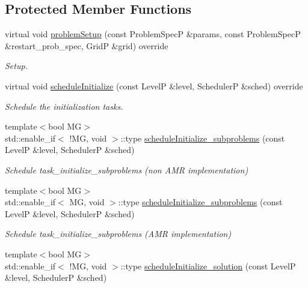 \subsection*{Protected Member Functions}
\begin{DoxyCompactItemize}
\item 
virtual void \hyperlink{classUintah_1_1PhaseField_1_1PureMetal_a2a7b57e07c20ed1a745904886da00323}{problem\+Setup} (const Problem\+SpecP \&params, const Problem\+SpecP \&restart\+\_\+prob\+\_\+spec, GridP \&grid) override
\begin{DoxyCompactList}\small\item\em Setup. \end{DoxyCompactList}\item 
virtual void \hyperlink{classUintah_1_1PhaseField_1_1PureMetal_a40c84aed55de21d116c941ae78cdfbaa}{schedule\+Initialize} (const LevelP \&level, SchedulerP \&sched) override
\begin{DoxyCompactList}\small\item\em Schedule the initialization tasks. \end{DoxyCompactList}\item 
{\footnotesize template$<$bool MG$>$ }\\std\+::enable\+\_\+if$<$ !MG, void $>$\+::type \hyperlink{classUintah_1_1PhaseField_1_1PureMetal_a1ec4eefc3acacbabe19312052f373141}{schedule\+Initialize\+\_\+subproblems} (const LevelP \&level, SchedulerP \&sched)
\begin{DoxyCompactList}\small\item\em Schedule task\+\_\+initialize\+\_\+subproblems (non A\+MR implementation) \end{DoxyCompactList}\item 
{\footnotesize template$<$bool MG$>$ }\\std\+::enable\+\_\+if$<$ MG, void $>$\+::type \hyperlink{classUintah_1_1PhaseField_1_1PureMetal_a1ec4eefc3acacbabe19312052f373141}{schedule\+Initialize\+\_\+subproblems} (const LevelP \&level, SchedulerP \&sched)
\begin{DoxyCompactList}\small\item\em Schedule task\+\_\+initialize\+\_\+subproblems (A\+MR implementation) \end{DoxyCompactList}\item 
{\footnotesize template$<$bool MG$>$ }\\std\+::enable\+\_\+if$<$ !MG, void $>$\+::type \hyperlink{classUintah_1_1PhaseField_1_1PureMetal_a1af29773c5193a9dbb14ff3988bba4fd}{schedule\+Initialize\+\_\+solution} (const LevelP \&level, SchedulerP \&sched)

\end{DoxyCompactItemize}
